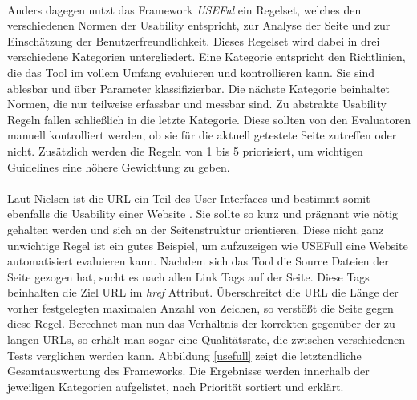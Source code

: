 \\
Anders dagegen nutzt das Framework \textit{USEFul} ein Regelset, welches den verschiedenen Normen der Usability entspricht, zur Analyse der Seite und zur Einschätzung der Benutzerfreundlichkeit. Dieses Regelset wird dabei in drei verschiedene Kategorien untergliedert. Eine Kategorie entspricht den Richtlinien, die das Tool im vollem Umfang evaluieren und kontrollieren kann. Sie sind ablesbar und über Parameter klassifizierbar. Die nächste Kategorie beinhaltet Normen, die nur teilweise erfassbar und messbar sind. Zu abstrakte Usability Regeln fallen schließlich in die letzte Kategorie. Diese sollten von den Evaluatoren manuell kontrolliert werden, ob sie für die aktuell getestete Seite zutreffen oder nicht. Zusätzlich werden die Regeln von 1 bis 5 priorisiert, um wichtigen Guidelines eine höhere Gewichtung zu geben.\\
\\
Laut Nielsen ist die URL ein Teil des User Interfaces und bestimmt somit ebenfalls die Usability einer Website \cite{urlasui}. Sie sollte so kurz und prägnant wie nötig gehalten werden und sich an der Seitenstruktur orientieren. Diese nicht ganz unwichtige Regel ist ein gutes Beispiel, um aufzuzeigen wie USEFull eine Website automatisiert evaluieren kann. Nachdem sich das Tool die Source Dateien der Seite gezogen hat, sucht es nach allen Link Tags auf der Seite. Diese Tags beinhalten die Ziel URL im \textit{href} Attribut. Überschreitet die URL die Länge der vorher festgelegten maximalen Anzahl von Zeichen, so verstößt die Seite gegen diese Regel. Berechnet man nun das Verhältnis der korrekten gegenüber der zu langen URLs, so erhält man sogar eine Qualitätsrate, die zwischen verschiedenen Tests verglichen werden kann. Abbildung \ref{usefull} zeigt die letztendliche Gesamtauswertung des Frameworks. Die Ergebnisse werden innerhalb der jeweiligen Kategorien aufgelistet, nach Priorität sortiert und erklärt.

